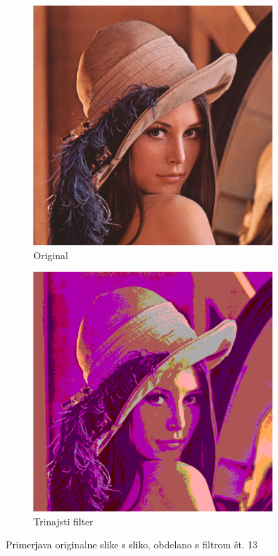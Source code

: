 \documentclass[a4paper, 12pt]{book}
\begin{document}
\begin{figure}[!ht]
    \centering
    \begin{subfigure}[b]{0.4\textwidth}
        \includegraphics[width=\textwidth]{lena}
        \caption{Original}
    \end{subfigure}
    \begin{subfigure}[b]{0.4\textwidth}
        \includegraphics[width=\textwidth]{lena_filter_13}
        \caption{Trinajsti filter}
    \end{subfigure}
    \caption{Primerjava originalne slike s sliko, obdelano s filtrom št. 13}
    \label{fig:lena_filter_13}
\end{figure}
\end{document}
